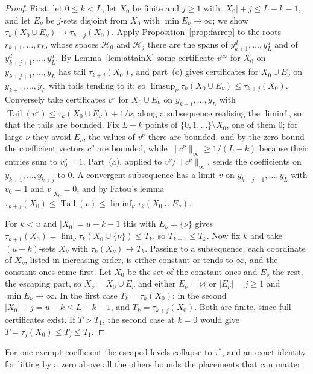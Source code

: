 \documentclass[11pt]{article}
\theoremstyle{definition}
\theoremstyle{plain}
\DeclareMathOperator{\Tail}{Tail}
\begin{document}
\begin{proof}
First, let $0\le k<L$, let $X_0$ be finite and $j\ge1$ with
$|X_0|+j\le L-k-1$, and let $E_\nu$ be $j$-sets disjoint from $X_0$ with
$\min E_\nu\to\infty$; we show $\tau_k(X_0\cup E_\nu)\to\tau_{k+j}(X_0)$.
Apply Proposition~\ref{prop:farrep} to the roots $r_{k+1},\ldots,r_L$, whose
spaces $\mathcal H_0$ and $\mathcal H_j$ there are the spans of
$y_{k+1}^d,\ldots,y_L^d$ and of $y_{k+j+1}^d,\ldots,y_L^d$.  By
Lemma~\ref{lem:attainX} some certificate $v^\infty$ for $X_0$ on
$y_{k+j+1},\ldots,y_L$ has tail $\tau_{k+j}(X_0)$, and part~(c) gives
certificates for $X_0\cup E_\nu$ on $y_{k+1},\ldots,y_L$ with tails tending
to it; so $\limsup_\nu\tau_k(X_0\cup E_\nu)\le\tau_{k+j}(X_0)$.
Conversely take certificates $v^\nu$ for $X_0\cup E_\nu$ on
$y_{k+1},\ldots,y_L$ with $\Tail(v^\nu)\le\tau_k(X_0\cup E_\nu)+1/\nu$,
along a subsequence realising the $\liminf$, so that the tails are bounded.
Fix $L-k$ points of $\{0,1,\ldots\}\setminus X_0$, one of them $0$; for
large $\nu$ they avoid $E_\nu$, the values of $v^\nu$ there are bounded, and
by the zero bound the coefficient vectors $c^\nu$ are bounded, while
$\|c^\nu\|_\infty\ge1/(L-k)$ because their entries sum to $v^\nu_0=1$.  Part~(a),
applied to $v^\nu/\|c^\nu\|_\infty$, sends the coefficients on
$y_{k+1},\ldots,y_{k+j}$ to $0$.  A convergent subsequence has a limit
$v$ on $y_{k+j+1},\ldots,y_L$ with $v_0=1$ and $v|_{X_0}=0$, and by Fatou's
lemma $\tau_{k+j}(X_0)\le\Tail(v)\le\liminf_\nu\tau_k(X_0\cup E_\nu)$.

For $k<u$ and $|X_0|=u-k-1$ this with $E_\nu=\{\nu\}$ gives
$\tau_{k+1}(X_0)=\lim_\nu\tau_k(X_0\cup\{\nu\})\le T_k$, so $T_{k+1}\le T_k$.
Now fix $k$ and take $(u-k)$-sets $X_\nu$ with $\tau_k(X_\nu)\to T_k$.
Passing to a subsequence, each coordinate of $X_\nu$, listed in increasing
order, is either constant or tends to $\infty$, and the constant ones come
first.  Let $X_0$ be the set of the constant ones and $E_\nu$ the rest, the
escaping part, so $X_\nu=X_0\cup E_\nu$ and either $E_\nu=\varnothing$ or
$|E_\nu|=j\ge1$ and $\min E_\nu\to\infty$.  In the first case $T_k=\tau_k(X_0)$; in the second
$|X_0|+j=u-k\le L-k-1$, and $T_k=\tau_{k+j}(X_0)$.  Both are finite, since
full certificates exist.  If $T>T_1$, the second case at $k=0$ would give
$T=\tau_j(X_0)\le T_j\le T_1$.
\end{proof}

For one exempt coefficient the escaped levels collapse to $\tau^*$, and an
exact identity for lifting by a zero above all the others bounds the
placements that can matter.
\end{document}
